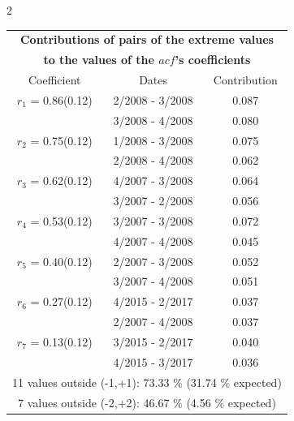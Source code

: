 
\thispagestyle{empty}
\begin{multicols}{2}{ 
\begin{tabular}{ccc}
\multicolumn{3}{c}{\textbf{Contributions of pairs of the extreme values} }  \vspace{-.10in}  \\ 
\multicolumn{3}{c}{ \textbf{to the values of the $acf$'s coefficients}} \\ 
\hline 
\hline                  Coefficient  &  Dates &  Contribution \\ 
\hline 
  $r_{ 1}$ = 0.86(0.12) &       2/2008 -  3/2008 &        0.087   \vspace{-.10in} \\  
&        3/2008 -  4/2008 &        0.080  \vspace{-.02in} \\ \hline 
  $r_{ 2}$ = 0.75(0.12) &       1/2008 -  3/2008 &        0.075   \vspace{-.10in} \\  
&        2/2008 -  4/2008 &        0.062  \vspace{-.02in} \\ \hline 
  $r_{ 3}$ = 0.62(0.12) &       4/2007 -  3/2008 &        0.064   \vspace{-.10in} \\  
&        3/2007 -  2/2008 &        0.056  \vspace{-.02in} \\ \hline 
  $r_{ 4}$ = 0.53(0.12) &       3/2007 -  3/2008 &        0.072   \vspace{-.10in} \\  
&        4/2007 -  4/2008 &        0.045  \vspace{-.02in} \\ \hline 
  $r_{ 5}$ = 0.40(0.12) &       2/2007 -  3/2008 &        0.052   \vspace{-.10in} \\  
&        3/2007 -  4/2008 &        0.051  \vspace{-.02in} \\ \hline 
  $r_{ 6}$ = 0.27(0.12) &       4/2015 -  2/2017 &        0.037   \vspace{-.10in} \\  
&        2/2007 -  4/2008 &        0.037  \vspace{-.02in} \\ \hline 
  $r_{ 7}$ = 0.13(0.12) &       3/2015 -  2/2017 &        0.040   \vspace{-.10in} \\  
&        4/2015 -  3/2017 &        0.036  \vspace{-.02in} \\ \hline 
\multicolumn{3}{c}{              11 values outside (-1,+1): 73.33  \% (31.74  \% expected)}\vspace{-.10in} \\ 
\multicolumn{3}{c}{               7 values outside (-2,+2): 46.67 \%  (4.56 \% expected) } \\
 \end{tabular} \\ 
 } 
\end{multicols} 
